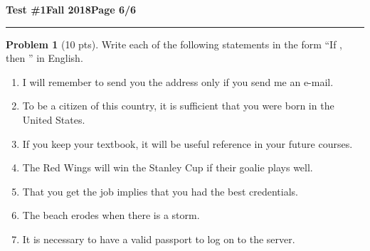 \documentclass[11pt]{article}
\theoremstyle{definition}
\newtheorem{problem}{Problem}
\begin{document}
\hfill{\large\bf Test \#1}\hfill{\large\bf Fall 2018}\hfill{\large\bf Page 6/6}\hrule

\bigskip

\begin{problem}[10 pts]
  Write each of the following statements in the form ``If \makebox[1cm]{\hrulefill}, then \makebox[1cm]{\hrulefill}'' in
  English.
  \begin{enumerate}
  \item I will remember to send you the address only if you send me an e-mail.
    \vspace{1cm}
  \item To be a citizen of this country, it is sufficient that you were born in the United States.
    \vspace{1cm}
  \item If you keep your textbook, it will be useful reference in your future courses.
    \vspace{1cm}
  \item The Red Wings will win the Stanley Cup if their goalie plays well.
    \vspace{1cm}
  \item That you get the job implies that you had the best credentials.
    \vspace{1cm}
  \item The beach erodes when there is a storm.
    \vspace{1cm}
  \item It is necessary to have a valid passport to log on to the server.
  \end{enumerate}
\end{problem}
\end{document}
